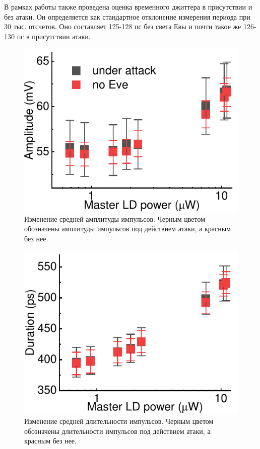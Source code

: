 В рамках работы также проведена оценка временного джиттера в присутствии и без атаки. Он определяется как стандартное отклонение измерения периода при 30 тыс. отсчетов. Оно составляет 125-128 пс без света Евы и почти такое же 126-130 пс в присутствии атаки. 

\begin{figure}%
	\centering
	\includegraphics[width=\linewidth]{images/amplitude_change.pdf}
	\caption{Изменение средней амплитуды импульсов. Черным цветом обозначены амплитуды импульсов под действием атаки, а красным без нее.}
	\label{fig:amplitude}
\end{figure}
\label{fig:amplitude}

\begin{figure}%
	\includegraphics[width=\linewidth]{images/duration_change.pdf}
	\caption{Изменение средней длительности импульсов. Черным цветом обозначены длительности импульсов под действием атаки, а красным без нее.}
	\label{fig:duration}
\end{figure}



